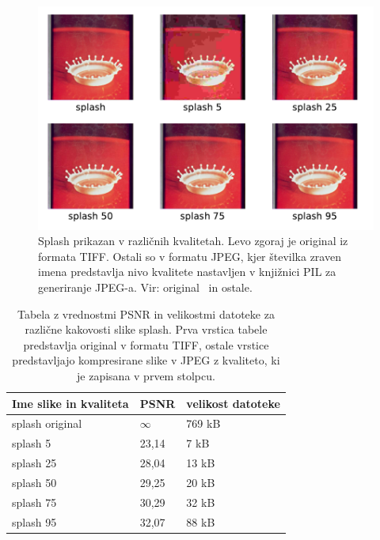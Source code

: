 \documentclass[a4paper,12pt,openright]{book}
\begin{document}
\begin{figure}[ht] %
\begin{center}
\includegraphics[width=1\textwidth]{slike/Quality_splash.pdf}
\end{center}
\caption{Splash prikazan v različnih kvalitetah. Levo zgoraj je original iz formata TIFF. Ostali so v formatu JPEG, kjer številka zraven imena predstavlja nivo kvalitete nastavljen v knjižnici PIL za generiranje JPEG-a. Vir: original~\cite{image_processing_slike} in ostale.}
\label{Quality_splash}
\end{figure}

\begin{table}[ht]
\centering
    \begin{tabular}{|l|l|l|}
    \hline
    Ime slike in kvaliteta &PSNR   &velikost datoteke         \\
    \hline                   
    splash original &$\infty$      & 769 kB                   \\ 
    splash 5        & 23,14        & 7   kB                   \\
    splash 25       & 28,04        & 13  kB                   \\  
    splash 50       & 29,25        & 20  kB                   \\  
    splash 75       & 30,29        & 32  kB                   \\  
    splash 95       & 32,07        & 88  kB                   \\  
    \hline
    \end{tabular}
    \caption{Tabela z vrednostmi PSNR in velikostmi datoteke za različne kakovosti slike splash. Prva vrstica tabele predstavlja original v formatu TIFF, ostale vrstice predstavljajo kompresirane slike v JPEG z kvaliteto, ki je zapisana v prvem stolpcu.}
\label{tab:splash_psnr}
\end{table}
\end{document}
